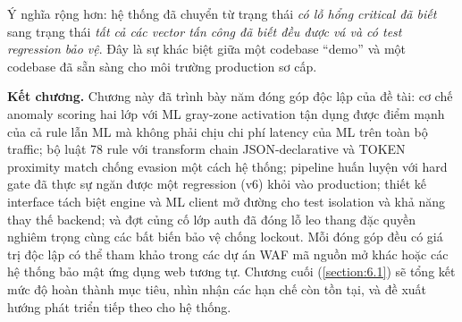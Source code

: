\documentclass[../DoAn.tex]{subfiles}
\begin{document}
Ý nghĩa rộng hơn: hệ thống đã chuyển từ trạng thái \textit{có lỗ hổng
critical đã biết} sang trạng thái \textit{tất cả các vector tấn công đã
biết đều được vá và có test regression bảo vệ}. Đây là sự khác biệt giữa
một codebase ``demo'' và một codebase đã sẵn sàng cho môi trường production
sơ cấp.

\bigskip
\noindent\textbf{Kết chương.}
Chương này đã trình bày năm đóng góp độc lập của đề tài: cơ chế anomaly
scoring hai lớp với ML gray-zone activation tận dụng được điểm mạnh của
cả rule lẫn ML mà không phải chịu chi phí latency của ML trên toàn bộ
traffic; bộ luật 78 rule với transform chain JSON-declarative và TOKEN
proximity match chống evasion một cách hệ thống; pipeline huấn luyện với
hard gate đã thực sự ngăn được một regression (v6) khỏi vào production;
thiết kế interface tách biệt engine và ML client mở đường cho test isolation
và khả năng thay thế backend; và đợt củng cố lớp auth đã đóng lỗ leo thang
đặc quyền nghiêm trọng cùng các bất biến bảo vệ chống lockout. Mỗi đóng
góp đều có giá trị độc lập có thể tham khảo trong các dự án WAF mã nguồn
mở khác hoặc các hệ thống bảo mật ứng dụng web tương tự. Chương cuối
(\ref{section:6.1}) sẽ tổng kết mức độ hoàn thành mục tiêu, nhìn nhận các
hạn chế còn tồn tại, và đề xuất hướng phát triển tiếp theo cho hệ thống.
\end{document}
